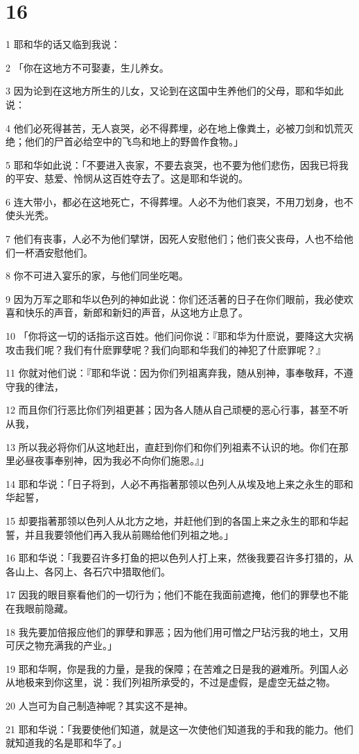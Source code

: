 \chapter{16}

\par 1 耶和华的话又临到我说：
\par 2 「你在这地方不可娶妻，生儿养女。
\par 3 因为论到在这地方所生的儿女，又论到在这国中生养他们的父母，耶和华如此说：
\par 4 他们必死得甚苦，无人哀哭，必不得葬埋，必在地上像粪土，必被刀剑和饥荒灭绝；他们的尸首必给空中的飞鸟和地上的野兽作食物。」
\par 5 耶和华如此说：「不要进入丧家，不要去哀哭，也不要为他们悲伤，因我已将我的平安、慈爱、怜悯从这百姓夺去了。这是耶和华说的。
\par 6 连大带小，都必在这地死亡，不得葬埋。人必不为他们哀哭，不用刀划身，也不使头光秃。
\par 7 他们有丧事，人必不为他们擘饼，因死人安慰他们；他们丧父丧母，人也不给他们一杯酒安慰他们。
\par 8 你不可进入宴乐的家，与他们同坐吃喝。
\par 9 因为万军之耶和华以色列的神如此说：你们还活著的日子在你们眼前，我必使欢喜和快乐的声音，新郎和新妇的声音，从这地方止息了。
\par 10 「你将这一切的话指示这百姓。他们问你说：『耶和华为什麽说，要降这大灾祸攻击我们呢？我们有什麽罪孽呢？我们向耶和华我们的神犯了什麽罪呢？』
\par 11 你就对他们说：『耶和华说：因为你们列祖离弃我，随从别神，事奉敬拜，不遵守我的律法，
\par 12 而且你们行恶比你们列祖更甚；因为各人随从自己顽梗的恶心行事，甚至不听从我，
\par 13 所以我必将你们从这地赶出，直赶到你们和你们列祖素不认识的地。你们在那里必昼夜事奉别神，因为我必不向你们施恩。』」
\par 14 耶和华说：「日子将到，人必不再指著那领以色列人从埃及地上来之永生的耶和华起誓，
\par 15 却要指著那领以色列人从北方之地，并赶他们到的各国上来之永生的耶和华起誓，并且我要领他们再入我从前赐给他们列祖之地。」
\par 16 耶和华说：「我要召许多打鱼的把以色列人打上来，然後我要召许多打猎的，从各山上、各冈上、各石穴中猎取他们。
\par 17 因我的眼目察看他们的一切行为；他们不能在我面前遮掩，他们的罪孽也不能在我眼前隐藏。
\par 18 我先要加倍报应他们的罪孽和罪恶；因为他们用可憎之尸玷污我的地土，又用可厌之物充满我的产业。」
\par 19 耶和华啊，你是我的力量，是我的保障；在苦难之日是我的避难所。列国人必从地极来到你这里，说：我们列祖所承受的，不过是虚假，是虚空无益之物。
\par 20 人岂可为自己制造神呢？其实这不是神。
\par 21 耶和华说：「我要使他们知道，就是这一次使他们知道我的手和我的能力。他们就知道我的名是耶和华了。」

